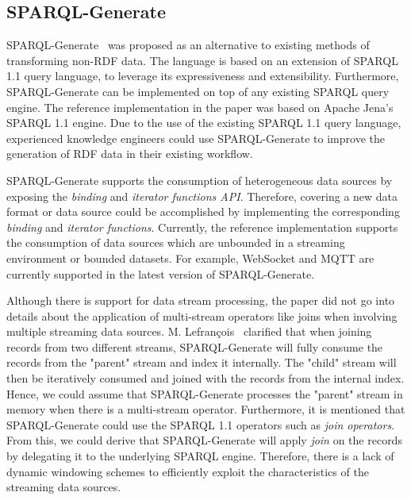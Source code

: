 \subsection{SPARQL-Generate}
SPARQL-Generate~\cite{sparql_generate} was proposed as an alternative to existing methods of 
transforming non-RDF data. The language is based on an extension of SPARQL 1.1 query language, to leverage 
its expressiveness and extensibility. Furthermore, SPARQL-Generate can be implemented on top 
of any existing SPARQL query engine. The reference implementation in the paper was based on Apache Jena's 
SPARQL 1.1 engine. Due to the use of the existing SPARQL 1.1 query language, experienced knowledge engineers could use 
SPARQL-Generate to improve the generation of RDF data in their existing workflow. 

SPARQL-Generate supports the consumption of heterogeneous data sources by exposing the 
\emph{binding} and \emph{iterator functions API}. Therefore, covering a new data format or data source could be accomplished 
by implementing the corresponding \emph{binding} and \emph{iterator functions}. Currently, 
the reference implementation supports the consumption of data sources which are unbounded in a 
streaming environment or bounded datasets. 
For example, WebSocket and MQTT are currently supported in the latest version of SPARQL-Generate. 

Although there is support for data stream processing, the paper did not go into details 
about the application of multi-stream operators like joins when involving multiple streaming 
data sources. M. Lefran\c{c}ois~\cite{sparql_generate} clarified that when joining
records from two different streams, SPARQL-Generate will fully consume the records 
from the "parent" stream and index it internally. The "child" stream will then be iteratively consumed and 
joined with the records from the internal index. Hence, we could assume that SPARQL-Generate processes the "parent" 
stream in memory when there is a multi-stream operator.
Furthermore, it is mentioned that SPARQL-Generate could use the SPARQL 1.1 operators such as \emph{join operators}. 
From this, we could derive that SPARQL-Generate will apply \emph{join} on the 
records by delegating it to the underlying SPARQL engine.
Therefore, there is a lack of  
dynamic windowing schemes to efficiently exploit the characteristics of the streaming data sources.  



